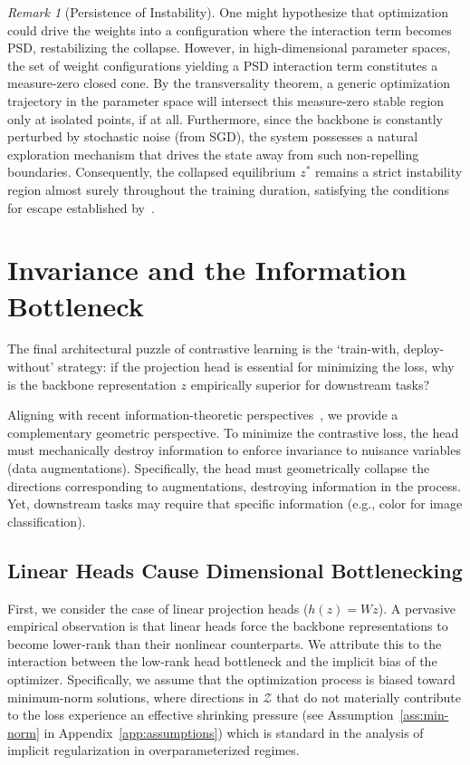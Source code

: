 \documentclass{article}
\theoremstyle{plain}
\theoremstyle{definition}
\theoremstyle{remark}
\newtheorem{remark}[theorem]{Remark}
\begin{document}
\begin{remark}[Persistence of Instability]
One might hypothesize that optimization could drive the weights into a configuration where the interaction term becomes PSD, restabilizing the collapse. However, in high-dimensional parameter spaces, the set of weight configurations yielding a PSD interaction term constitutes a measure-zero closed cone. By the transversality theorem, a generic optimization trajectory in the parameter space will intersect this measure-zero stable region only at isolated points, if at all. Furthermore, since the backbone is constantly perturbed by stochastic noise (from SGD), the system possesses a natural exploration mechanism that drives the state away from such non-repelling boundaries. Consequently, the collapsed equilibrium $z^*$ remains a strict instability region almost surely throughout the training duration, satisfying the conditions for escape established by~\citet{lee2016gradient}.
\end{remark}

\section{Invariance and the Information Bottleneck}
\label{sec:invariance}

The final architectural puzzle of contrastive learning is the `train-with, deploy-without' strategy: if the projection head is essential for minimizing the loss, why is the backbone representation $z$ empirically superior for downstream tasks?

Aligning with recent information-theoretic perspectives~\citep{ouyang2025projection}, we provide a complementary geometric perspective. To minimize the contrastive loss, the head must mechanically destroy information to enforce invariance to nuisance variables (data augmentations). Specifically, the head must geometrically collapse the directions corresponding to augmentations, destroying information in the process. Yet, downstream tasks may require that specific information (e.g., color for image classification).

\subsection{Linear Heads Cause Dimensional Bottlenecking}
\label{sub:linear-rank}

First, we consider the case of linear projection heads ($h(z) = Wz$). A pervasive empirical observation is that linear heads force the backbone representations to become lower-rank than their nonlinear counterparts. We attribute this to the interaction between the low-rank head bottleneck and the implicit bias of the optimizer. Specifically, we assume that the optimization process is biased toward minimum-norm solutions, where directions in $\mathcal{Z}$ that do not materially contribute to the loss experience an effective shrinking pressure (see Assumption~\ref{ass:min-norm} in Appendix~\ref{app:assumptions}) which is standard in the analysis of implicit regularization in overparameterized regimes.
\end{document}
